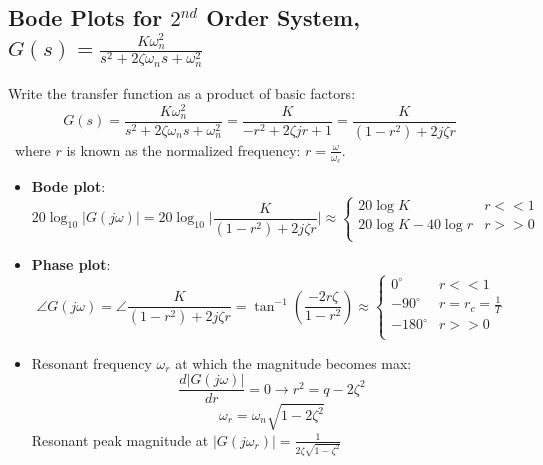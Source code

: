 \documentclass[12pt,a4paper]{article}
\begin{document}
\subsection{Bode Plots for $2^{nd}$ Order System, $G(s) = \frac{K\omega_{n}^{2}}{s^{2}+2\zeta\omega_{n}s+\omega_{n}^{2}}$}
Write the transfer function as a product of basic factors:
\[G(s) = \frac{K\omega_{n}^{2}}{s^{2}+2\zeta\omega_{n}s+\omega_{n}^{2}}=\frac{K}{-r^{2}+2\zeta jr +1}=\frac{K}{(1-r^{2})+2j\zeta r}\]
\ where $r$ is known as the normalized frequency: $r = \frac{\omega}{\omega_{c}}$.
\begin{itemize}
\item \textbf{Bode plot}:
\[20\log_{10}\lvert G(j\omega) \rvert  =  20\log_{10} \bigg\lvert \frac{K}{(1-r^{2})+2j\zeta r} \bigg\rvert \approx \begin{cases}
20\log K & r<<1\\
20\log K - 40\log r & r>>0\\
\end{cases}\]

\item \textbf{Phase plot}:
\[\angle G(j\omega) = \angle \frac{K}{(1-r^{2})+2j\zeta r} =  \tan^{-1}(\frac{-2r\zeta}{1-r^{2}}) \approx \begin{cases}
0^{\circ} & r<<1\\
-90^{\circ}& r=r_{c}=\frac{1}{T}\\
-180^{\circ}& r>>0\\
\end{cases}\]
\item Resonant frequency $\omega_{r}$ at which the magnitude becomes max:
\[\frac{d\lvert G(j\omega) \rvert}{dr}=0 \to r^{2} = q-2\zeta^{2}\]
\[\omega_{r} = \omega_{n}\sqrt{1-2\zeta^{2}}\]
Resonant peak magnitude at $\lvert G(j\omega_{r}) \rvert =\frac{1}{2\zeta\sqrt{1-\zeta^{2}}} $
\end{itemize}
\vspace{-1cm}
\end{document}

